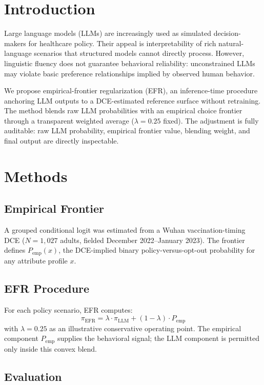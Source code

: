 \documentclass[12pt]{article}
\begin{document}
\newpage
\section{Introduction}
\label{sec:intro}

Large language models (LLMs) are increasingly used as simulated decision-makers for healthcare policy. Their appeal is interpretability of rich natural-language scenarios that structured models cannot directly process. However, linguistic fluency does not guarantee behavioral reliability: unconstrained LLMs may violate basic preference relationships implied by observed human behavior.

We propose empirical-frontier regularization (EFR), an inference-time procedure anchoring LLM outputs to a DCE-estimated reference surface without retraining. The method blends raw LLM probabilities with an empirical choice frontier through a transparent weighted average ($\lambda=0.25$ fixed). The adjustment is fully auditable: raw LLM probability, empirical frontier value, blending weight, and final output are directly inspectable.

\section{Methods}
\label{sec:methods}

\subsection{Empirical Frontier}

A grouped conditional logit was estimated from a Wuhan vaccination-timing DCE ($N=1{,}027$ adults, fielded December 2022--January 2023). The frontier defines $P_{\text{emp}}(x)$, the DCE-implied binary policy-versus-opt-out probability for any attribute profile $x$.

\subsection{EFR Procedure}

For each policy scenario, EFR computes:
\[
\pi_{\text{EFR}} = \lambda \cdot \pi_{\text{LLM}} + (1-\lambda) \cdot P_{\text{emp}}
\]
with $\lambda=0.25$ as an illustrative conservative operating point. The empirical component $P_{\text{emp}}$ supplies the behavioral signal; the LLM component is permitted only inside this convex blend.

\subsection{Evaluation}
\end{document}
